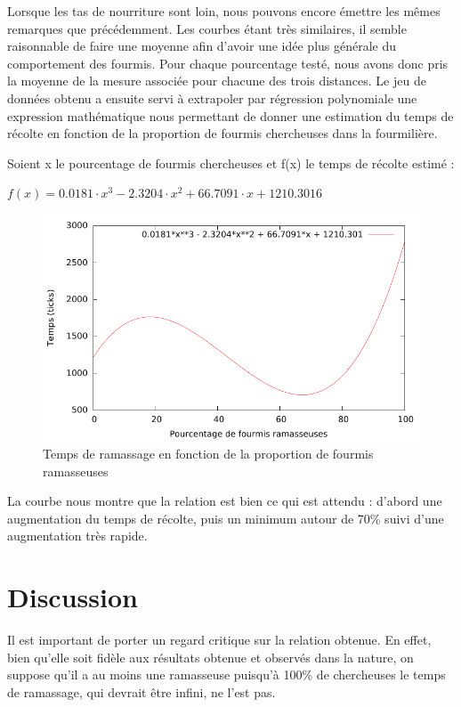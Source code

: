 \documentclass{article}
\begin{document}
Lorsque les tas de nourriture sont loin, nous pouvons encore émettre les mêmes remarques que précédemment. Les courbes étant très similaires, il semble raisonnable de faire une moyenne afin d'avoir une idée plus générale du comportement des fourmis. Pour chaque pourcentage testé, nous avons donc pris la moyenne de la mesure associée pour chacune des trois distances. Le jeu de données obtenu a ensuite servi à extrapoler par régression polynomiale une expression mathématique nous permettant de donner une estimation du temps de récolte en fonction de la proportion de fourmis chercheuses dans la fourmilière. 

Soient x le pourcentage de fourmis chercheuses et f(x) le temps de récolte estimé :

\begin{math}
 f(x) = 0.0181\cdot x^3 - 2.3204\cdot x^2 + 66.7091\cdot x + 1210.3016
 \end{math}

\begin{figure}[H]
\centering
\includegraphics[scale=0.6]{contenu/avg.pdf}
\caption{Temps de ramassage en fonction de la proportion de fourmis ramasseuses}
\label{fig:relation}
\end{figure}

La courbe nous montre que la relation est bien ce qui est attendu : d'abord une augmentation du temps de récolte, puis un minimum autour de 70\% suivi d'une augmentation très rapide.
\section{Discussion}
Il est important de porter un regard critique sur la relation obtenue. En effet, bien qu'elle soit fidèle aux résultats obtenue et observés dans la nature, on suppose qu'il a au moins une ramasseuse puisqu'à 100\% de chercheuses le temps de ramassage, qui devrait être infini, ne l'est pas.
\end{document}

